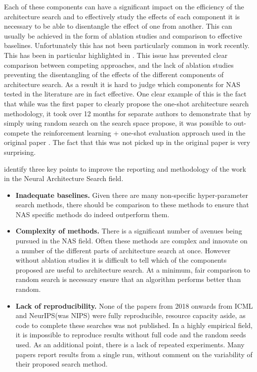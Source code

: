 Each of these components can have a significant impact on the efficiency of the architecture search and to effectively study the effects of each component it is necessary to be able to disentangle the effect of one from another. This can usually be achieved in the form of ablation studies and comparison to effective baselines. Unfortunately this has not been particularly common in work recently. This has been in particular highlighted in \citet{Li}. This issue has prevented clear comparison between competing approaches, and the lack of ablation studies preventing the disentangling of the effects of the different components of architecture search. As a result it is hard to judge which components for NAS tested in the literature are in fact effective. One clear example of this is the fact that while \citet{Pham2018} was the first paper to clearly propose the one-shot architecture search methodology, it took over 12 months for separate authors to demonstrate that by simply using random search on the search space propose, it was possible to out-compete the reinforcement learning + one-shot evaluation approach used in the original paper \citep{Sciuto,Adam2019}. The fact that this was not picked up in the original paper is very surprising.

\citet{Li} identify three key points to improve the reporting and methodology of the work in the Neural Architecture Search field.
\begin{itemize}
	\item \textbf{Inadequate baselines.} Given there are many non-specific hyper-parameter search methods, there should be comparison to these methods to ensure that NAS specific methods do indeed outperform them.
	\item \textbf{Complexity of methods.} There is a significant number of avenues being pursued in the NAS field. Often these methods are complex and innovate on a number of the different parts of architecture search at once. However without ablation studies it is difficult to tell which of the components proposed are useful to architecture search. At a minimum, fair comparison to random search is necessary ensure that an algorithm performs better than random.
	\item \textbf{Lack of reproducibility.} None of the papers from 2018 onwards from ICML and NeurIPS(was NIPS) were fully reproducible, resource capacity aside, as code to complete these searches was not published. In a highly empirical field, it is impossible to reproduce results without full code and the random seeds used. As an additional point, there is a lack of repeated experiments. Many papers report results from a single run, without comment on the variability of their proposed search method.
\end{itemize}

